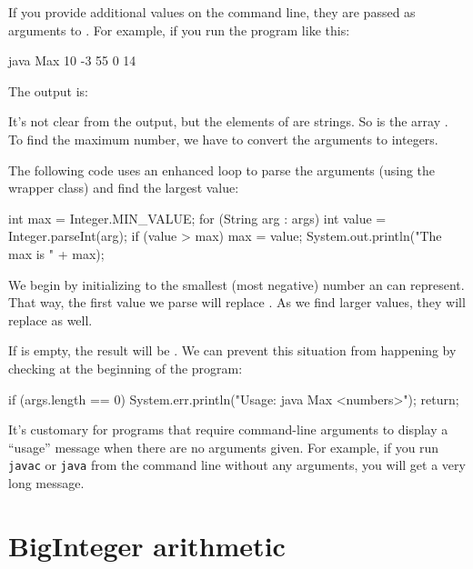 If you provide additional values on the command line, they are passed as arguments to .
For example, if you run the program like this:

\begin{stdout}
java Max 10 -3 55 0 14
\end{stdout}

The output is:

\begin{stdout}
[10, -3, 55, 0, 14]
\end{stdout}

It's not clear from the output, but the elements of  are strings.
So  is the array .
To find the maximum number, we have to convert the arguments to integers.

The following code uses an enhanced  loop to parse the arguments (using the  wrapper class) and find the largest value:

\begin{code}
int max = Integer.MIN_VALUE;
for (String arg : args) {
    int value = Integer.parseInt(arg);
    if (value > max) {
        max = value;
    }
}
System.out.println("The max is " + max);
\end{code}

We begin by initializing  to the smallest (most negative) number an  can represent.
That way, the first value we parse will replace .
As we find larger values, they will replace  as well.

If  is empty, the result will be .
We can prevent this situation from happening by checking  at the beginning of the program:

\begin{code}
if (args.length == 0) {
    System.err.println("Usage: java Max <numbers>");
    return;
}
\end{code}

It's customary for programs that require command-line arguments to display a ``usage'' message when there are no arguments given.
For example, if you run {\tt javac} or {\tt java} from the command line without any arguments, you will get a very long message.


\section{BigInteger arithmetic}

